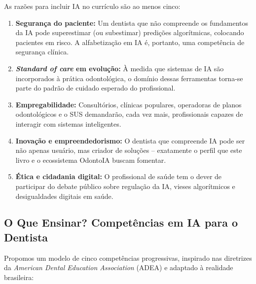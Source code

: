As razões para incluir IA no currículo são ao menos cinco:

\begin{enumerate}
  \item \textbf{Segurança do paciente:} Um dentista que não compreende os
    fundamentos da IA pode superestimar (ou subestimar) predições algorítmicas,
    colocando pacientes em risco. A alfabetização em IA é, portanto, uma
    competência de segurança clínica.

  \item \textbf{\textit{Standard of care} em evolução:} À medida que sistemas de
    IA são incorporados à prática odontológica, o domínio dessas ferramentas
    torna-se parte do padrão de cuidado esperado do profissional.

  \item \textbf{Empregabilidade:} Consultórios, clínicas populares, operadoras
    de planos odontológicos e o SUS demandarão, cada vez mais, profissionais
    capazes de interagir com sistemas inteligentes.

  \item \textbf{Inovação e empreendedorismo:} O dentista que compreende IA pode
    ser não apenas usuário, mas criador de soluções -- exatamente o perfil que
    este livro e o ecossistema OdontoIA buscam fomentar.

  \item \textbf{Ética e cidadania digital:} O profissional de saúde tem o dever
    de participar do debate público sobre regulação da IA, vieses algorítmicos
    e desigualdades digitais em saúde.
\end{enumerate}

\subsection{O Que Ensinar? Competências em IA para o Dentista}

Propomos um modelo de cinco competências progressivas, inspirado nas diretrizes
da \textit{American Dental Education Association} (ADEA) e adaptado à realidade
brasileira:

